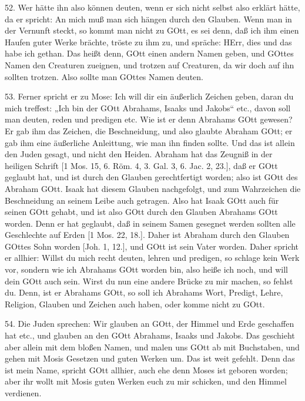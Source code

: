 52. Wer hätte ihn also können deuten, wenn er sich nicht selbst also erklärt hätte, da er spricht: An mich muß man sich hängen durch den Glauben. Wenn man in der Vernunft steckt, so kommt man nicht zu GOtt, es sei denn, daß ich ihm einen Haufen guter Werke brächte, tröste zu ihm zu, und spräche: HErr, dies und das habe ich gethan. Das heißt denn, GOtt einen andern Namen geben, und GOttes Namen den Creaturen zueignen, und trotzen auf Creaturen, da wir doch auf ihn sollten trotzen. Also sollte man GOttes Namen deuten.

53. Ferner spricht er zu Mose: Ich will dir ein äußerlich Zeichen geben, daran du mich treffest: „Ich bin der GOtt Abrahams, Isaaks und Jakobs“ etc., davon soll man deuten, reden und predigen etc. Wie ist er denn Abrahams GOtt gewesen? Er gab ihm das Zeichen, die Beschneidung, und also glaubte Abraham GOtt; er gab ihm eine äußerliche Anleittung, wie man ihn finden sollte. Und das ist allein den Juden gesagt, und nicht den Heiden. Abraham hat das Zeugniß in der heiligen Schrift [1 Mos. 15, 6. Röm. 4, 3. Gal. 3, 6. Jac. 2, 23.], daß er GOtt geglaubt hat, und ist durch den Glauben gerechtfertigt worden; also ist GOtt des Abraham GOtt. Isaak hat diesem Glauben nachgefolgt, und zum Wahrzeichen die Beschneidung an seinem Leibe auch getragen. Also hat Isaak GOtt auch für seinen GOtt gehabt, und ist also GOtt durch den Glauben Abrahams GOtt worden. Denn er hat geglaubt, daß in seinem Samen gesegnet werden sollten alle Geschlechte auf Erden [1 Mos. 22, 18.]. Daher ist Abraham durch den Glauben GOttes Sohn worden [Joh. 1, 12.], und GOtt ist sein Vater worden. Daher spricht er allhier: Willst du mich recht deuten, lehren und predigen, so schlage kein Werk vor, sondern wie ich Abrahams GOtt worden bin, also heiße ich noch, und will dein GOtt auch sein. Wirst du nun eine andere Brücke zu mir machen, so fehlst du. Denn, ist er Abrahams GOtt, so soll ich Abrahams Wort, Predigt, Lehre, Religion, Glauben und Zeichen auch haben, oder komme nicht zu GOtt.

54. Die Juden sprechen: Wir glauben an GOtt, der Himmel und Erde geschaffen hat etc., und glauben an den GOtt Abrahams, Isaaks und Jakobs. Das geschieht aber allein mit dem bloßen Namen, und malen uns GOtt ab mit Buchstaben, und gehen mit Mosis Gesetzen und guten Werken um. Das ist weit gefehlt. Denn das ist mein Name, spricht GOtt allhier, auch ehe denn Moses ist geboren worden; aber ihr wollt mit Mosis guten Werken euch zu mir schicken, und den Himmel verdienen.

